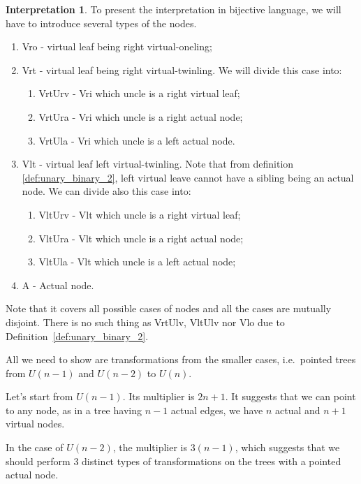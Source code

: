 \documentclass[final]{article}
\theoremstyle{definition}
\theoremstyle{definition}
\newtheorem{interpretation}{Interpretation}[subsection]
\theoremstyle{remark}
\begin{document}
\begin{interpretation}
To present the interpretation in bijective language, we will have to introduce several types of the nodes.

\begin{enumerate}
    \item Vro - virtual leaf being right virtual-oneling;
    \item Vrt - virtual leaf being right virtual-twinling. We will divide this case into:
        \begin{enumerate}
            \item VrtUrv - Vri which uncle is a right virtual leaf;
            \item VrtUra - Vri which uncle is a right actual node;
            \item VrtUla - Vri which uncle is a left actual node.
        \end{enumerate}
    \item Vlt - virtual leaf left virtual-twinling. Note that from definition \ref{def:unary_binary_2}, left virtual leave cannot have a sibling being an actual node. We can divide also this case into:
        \begin{enumerate}
            \item VltUrv - Vlt which uncle is a right virtual leaf;
            \item VltUra - Vlt which uncle is a right actual node;
            \item VltUla - Vlt which uncle is a left actual node;
        \end{enumerate}
    \item A - Actual node.
\end{enumerate}

Note that it covers all possible cases of nodes and all the cases are mutually disjoint. There is no such thing as VrtUlv, VltUlv nor Vlo due to Definition~\ref{def:unary_binary_2}.

All we need to show are transformations from the smaller cases, i.e.\ pointed trees from \(U(n-1)\) and \(U(n-2)\) to \(U(n)\).

Let's start from \(U(n-1)\). Its multiplier is \(2n + 1\). It suggests that we can point to any node, as in a tree having \(n - 1\) actual edges, we have \(n\) actual and \(n + 1\) virtual nodes.

In the case of \(U(n-2)\), the multiplier is \(3(n-1)\), which suggests that we should perform \(3\) distinct types of transformations on the trees with a pointed actual node.


\end{interpretation}
\end{document}
